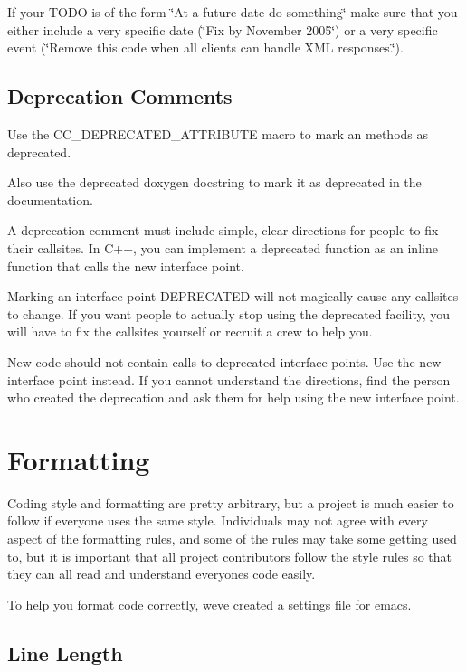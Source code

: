 If your T\+O\+DO is of the form \char`\"{}\+At a future date do something\char`\"{} make sure that you either include a very specific date (\char`\"{}\+Fix by November 2005\char`\"{}) or a very specific event (\char`\"{}\+Remove this code when all clients can handle X\+M\+L responses.\char`\"{}).

\subsection*{Deprecation Comments}

Use the {\ttfamily C\+C\+\_\+\+D\+E\+P\+R\+E\+C\+A\+T\+E\+D\+\_\+\+A\+T\+T\+R\+I\+B\+U\+TE} macro to mark an methods as deprecated.

Also use the {\ttfamily deprecated} doxygen docstring to mark it as deprecated in the documentation.

A deprecation comment must include simple, clear directions for people to fix their callsites. In C++, you can implement a deprecated function as an inline function that calls the new interface point.

Marking an interface point D\+E\+P\+R\+E\+C\+A\+T\+ED will not magically cause any callsites to change. If you want people to actually stop using the deprecated facility, you will have to fix the callsites yourself or recruit a crew to help you.

New code should not contain calls to deprecated interface points. Use the new interface point instead. If you cannot understand the directions, find the person who created the deprecation and ask them for help using the new interface point.

\section*{Formatting}

Coding style and formatting are pretty arbitrary, but a project is much easier to follow if everyone uses the same style. Individuals may not agree with every aspect of the formatting rules, and some of the rules may take some getting used to, but it is important that all project contributors follow the style rules so that they can all read and understand everyone\textquotesingle{}s code easily.

To help you format code correctly, we\textquotesingle{}ve created a settings file for emacs.

\subsection*{Line Length}

